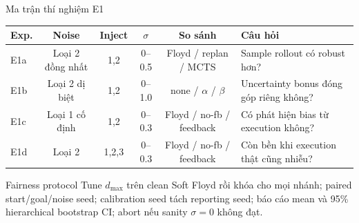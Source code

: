 \documentclass[aspectratio=169,10pt]{beamer}
\begin{document}
\begin{frame}{Ma trận thí nghiệm E1}
  \scriptsize
  \begin{tabularx}{\textwidth}{@{}lccccX@{}}
    \toprule
    \textbf{Exp.} & \textbf{Noise} & \textbf{Inject} & \textbf{$\sigma$}
      & \textbf{So sánh} & \textbf{Câu hỏi} \\
    \midrule
    E1a & Loại 2 đồng nhất & 1,2 & 0--0.5
      & Floyd / replan / MCTS
      & Sample rollout có robust hơn? \\
    E1b & Loại 2 dị biệt & 1,2 & 0--1.0
      & none / $\alpha$ / $\beta$
      & Uncertainty bonus đóng góp riêng không? \\
    E1c & Loại 1 cố định & 1,2 & 0--0.3
      & Floyd / no-fb / feedback
      & Có phát hiện bias từ execution không? \\
    E1d & Loại 2 & 1,2,3 & 0--0.3
      & Floyd / no-fb / feedback
      & Còn bền khi execution thật cũng nhiễu? \\
    \bottomrule
  \end{tabularx}

  \vspace{0.8em}
  \begin{block}{Fairness protocol}
    Tune $d_{\max}$ trên clean Soft Floyd rồi khóa cho mọi nhánh; paired
    start/goal/noise seed; calibration seed tách reporting seed; báo cáo mean và
    95\% hierarchical bootstrap CI; abort nếu sanity $\sigma=0$ không đạt.
  \end{block}
\end{frame}
\end{document}
